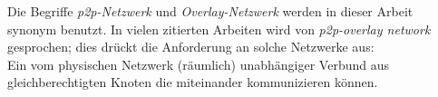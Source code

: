 Die Begriffe \emph{p2p-Netzwerk} und \emph{Overlay-Netzwerk} werden in dieser Arbeit synonym benutzt. In vielen zitierten Arbeiten wird von \emph{p2p-overlay network} gesprochen; dies drückt die Anforderung an solche Netzwerke aus:\\
Ein vom physischen Netzwerk (räumlich) unabhängiger Verbund aus gleichberechtigten Knoten die miteinander kommunizieren können.








